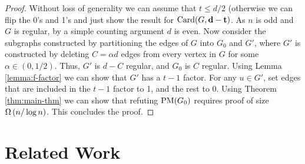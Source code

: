 \documentclass[11pt]{article}
\begin{document}
\begin{proof}
  Without loss of generality we can assume that $t \le d/2$ (otherwise we can flip the 0's and 1's and just show the result for $\text{Card}(G, \mathbf{d-t})$.
  As $n$ is odd and $G$ is regular, by a simple counting argument $d$ is even.
  Now consider the subgraphs constructed by partitioning the edges of $G$ into $G_0$ and $G'$, where $G'$ is constructed by deleting $C=\alpha d$ edges from every vertex in $G$ for some $\alpha \in (0,1/2)$.
  Thus, $G'$ is $d - C$ regular, and $G_0$ is $C$ regular.
  Using Lemma \ref{lemma:f-factor} we can show that $G'$ has a $t-1$ factor.
  For any $u \in G'$, set edges that are included in the $t-1$ factor to 1, and the rest to 0.
  Using Theorem \ref{thm:main-thm} we can show that refuting $\text{PM}(G_0)$ requires proof of size $\Omega\left(n/\log n\right)$.
This concludes the proof.
\end{proof}


\section{Related Work}
\label{sec:related-work}

\newpage


\clearpage
\appendix
\end{document}
